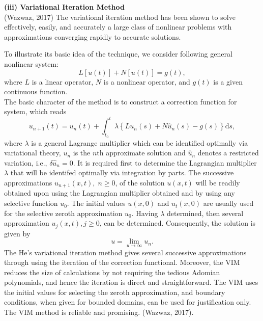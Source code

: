 \documentclass[12pt]{report}
\newcommand{\NI}{\noindent}
\newcommand{\bt}[1]{\textbf{#1}}
\begin{document}
\NI\bt{(iii) Variational Iteration Method}\\
(Wazwaz, 2017) The variational iteration method has been shown to solve effectively, easily, and accurately a large class of nonlinear problems with approximations converging rapidly to accurate solutions.

\NI To illustrate its basic idea of the technique, we consider following general nonlinear system:
\begin{equation}
	L[u(t)] + N[u(t)] = g(t),
\end{equation}
where $L$ is a linear operator, $N$ is a nonlinear operator, and $g(t)$ is a given continuous function.\\

\NI The basic character of the method is to construct a correction function for system, which reads
\begin{equation}
	u_{n+1}(t) = u_n(t) + \int_{t_0}^{t} \lambda\left\{Lu_n(s) + N\hat{u}_n(s) - g(s)\right\}\text{d}s,
\end{equation}
where $\lambda$ is a general Lagrange multiplier which can be identified optimally via variational theory, $u_n$ is the $n$th approximate solution and $\hat{u}_n$ denotes a restricted variation, i.e., $\delta \hat{u}_n = 0$. It is required first to determine the Lagrangian multiplier $\lambda$ that will be identifed optimally via integration by parts. The successive approximations $u_{n+1}(x,t), \; n \geq 0$, of the solution $u(x,t)$ will be readily obtained upon using the Lagrangian multiplier obtained and by using any selective function $u_0$. The initial values $u(x,0)$ and $u_t(x,0)$ are usually used for the selective zeroth approximation $u_0$. Having $\lambda$ determined, then several approximation $u_j(x,t), j\geq 0$, can be determined. Consequently, the solution is given by 
\begin{equation}
	u = \lim\limits_{u \rightarrow \infty}u_n.
\end{equation}
 The He's variational iteration method gives several successive approximations through using the iteration of the correction functional. Moreover, the VIM reduces the size of calculations by not requiring the tedious Adomian polynomials, and hence the iteration is direct and straightforward. The VIM uses the initial values for selecting the zeroth approximation, and boundary conditions, when given for bounded domains, can be used for justification only. The VIM method is reliable and promising. (Wazwaz, 2017).


\chapter{}
\end{document}
